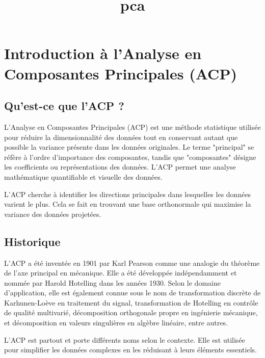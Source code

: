 \documentclass[12pt]{article}
\title{pca}
\author{}
\date{}
\begin{document}
\maketitle
\tableofcontents
\newpage

\section{Introduction à l'Analyse en Composantes Principales (ACP)}

\subsection{Qu'est-ce que l'ACP ?}

L'Analyse en Composantes Principales (ACP) est une méthode statistique utilisée pour réduire la dimensionnalité des données tout en conservant autant que possible la variance présente dans les données originales. Le terme "principal" se réfère à l'ordre d'importance des composantes, tandis que "composantes" désigne les coefficients ou représentations des données. L'ACP permet une analyse mathématique quantifiable et visuelle des données.

\begin{tcolorbox}[title={Intuition}]
L'ACP cherche à identifier les directions principales dans lesquelles les données varient le plus. Cela se fait en trouvant une base orthonormale qui maximise la variance des données projetées.
\end{tcolorbox}

\subsection{Historique}

L'ACP a été inventée en 1901 par Karl Pearson comme une analogie du théorème de l'axe principal en mécanique. Elle a été développée indépendamment et nommée par Harold Hotelling dans les années 1930. Selon le domaine d'application, elle est également connue sous le nom de transformation discrète de Karhunen-Loève en traitement du signal, transformation de Hotelling en contrôle de qualité multivarié, décomposition orthogonale propre en ingénierie mécanique, et décomposition en valeurs singulières en algèbre linéaire, entre autres.

\begin{tcolorbox}[title={Vulgarisation simple}]
L'ACP est partout et porte différents noms selon le contexte. Elle est utilisée pour simplifier les données complexes en les réduisant à leurs éléments essentiels.
\end{tcolorbox}
\end{document}
